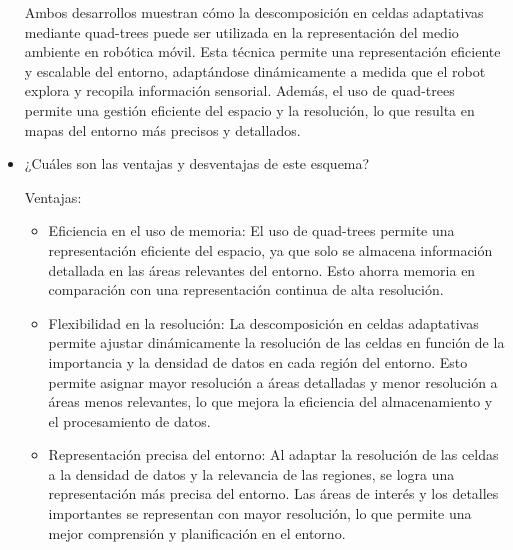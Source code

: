 \documentclass{article}
\begin{document}
\begin{itemize}
\begin{enumerate}
  \end{enumerate}

  Ambos desarrollos muestran cómo la descomposición en celdas adaptativas mediante quad-trees puede ser utilizada en la representación del medio ambiente en robótica móvil. Esta técnica permite una representación eficiente y escalable del entorno, adaptándose dinámicamente a medida que el robot explora y recopila información sensorial. Además, el uso de quad-trees permite una gestión eficiente del espacio y la resolución, lo que resulta en mapas del entorno más precisos y detallados.
  
\item {¿Cuáles son las ventajas y desventajas de este esquema?}


  Ventajas:
  \begin{itemize}
  \item Eficiencia en el uso de memoria: El uso de quad-trees permite una representación eficiente del espacio, ya que solo se almacena información detallada en las áreas relevantes del entorno. Esto ahorra memoria en comparación con una representación continua de alta resolución.
  \item Flexibilidad en la resolución: La descomposición en celdas adaptativas permite ajustar dinámicamente la resolución de las celdas en función de la importancia y la densidad de datos en cada región del entorno. Esto permite asignar mayor resolución a áreas detalladas y menor resolución a áreas menos relevantes, lo que mejora la eficiencia del almacenamiento y el procesamiento de datos.
  \item Representación precisa del entorno: Al adaptar la resolución de las celdas a la densidad de datos y la relevancia de las regiones, se logra una representación más precisa del entorno. Las áreas de interés y los detalles importantes se representan con mayor resolución, lo que permite una mejor comprensión y planificación en el entorno.
  \end{itemize}


\end{itemize}
\end{document}
